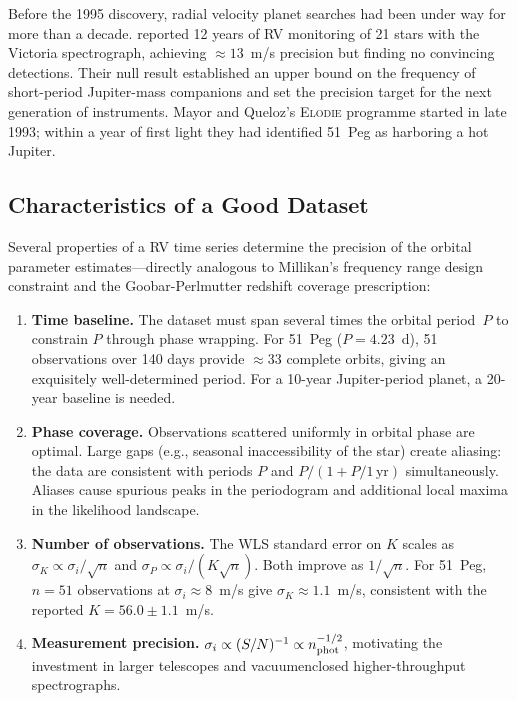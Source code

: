 \documentclass[12pt]{article}
\begin{document}
Before the 1995 discovery, radial velocity planet searches had been
under way for more than a decade.  \citet{Walker1995} reported 12 years
of RV monitoring of 21 stars with the Victoria spectrograph, achieving
$\approx 13$~m/s precision but finding no convincing detections.  Their
null result established an upper bound on the frequency of short-period
Jupiter-mass companions and set the precision target for the next
generation of instruments.  Mayor and Queloz's \textsc{Elodie} programme
started in late 1993; within a year of first light they had identified
51~Peg as harboring a hot Jupiter.

\subsection{Characteristics of a Good Dataset}

Several properties of a RV time series determine the precision of the
orbital parameter estimates---directly analogous to Millikan's frequency
range design constraint and the Goobar-Perlmutter redshift coverage
prescription:

\begin{enumerate}
  \item \textbf{Time baseline.}  The dataset must span several times the
    orbital period~$P$ to constrain $P$ through phase wrapping.
    For 51~Peg ($P = 4.23$~d), 51 observations over 140 days provide
    $\approx 33$ complete orbits, giving an exquisitely well-determined
    period.  For a 10-year Jupiter-period planet, a 20-year baseline is
    needed.

  \item \textbf{Phase coverage.}  Observations scattered uniformly
    in orbital phase are optimal.  Large gaps (e.g., seasonal
    inaccessibility of the star) create aliasing: the data are
    consistent with periods $P$ and $P/(1 + P/1\,\text{yr})$
    simultaneously.  Aliases cause spurious peaks in the periodogram
    and additional local maxima in the likelihood landscape.

  \item \textbf{Number of observations.}  The WLS standard error on $K$
    scales as $\sigma_K \propto \sigma_i/\sqrt{n}$ and
    $\sigma_P \propto \sigma_i/(K\sqrt{n})$.  Both improve as
    $1/\sqrt{n}$.  For 51~Peg, $n=51$ observations at $\sigma_i \approx
    8$~m/s give $\sigma_K \approx 1.1$~m/s, consistent with the
    reported $K = 56.0 \pm 1.1$~m/s.

  \item \textbf{Measurement precision.}  $\sigma_i \propto (S/N)^{-1}
    \propto n_{\rm phot}^{-1/2}$, motivating the investment in
    larger telescopes and vacuumenclosed higher-throughput spectrographs.
\end{enumerate}
\end{document}
